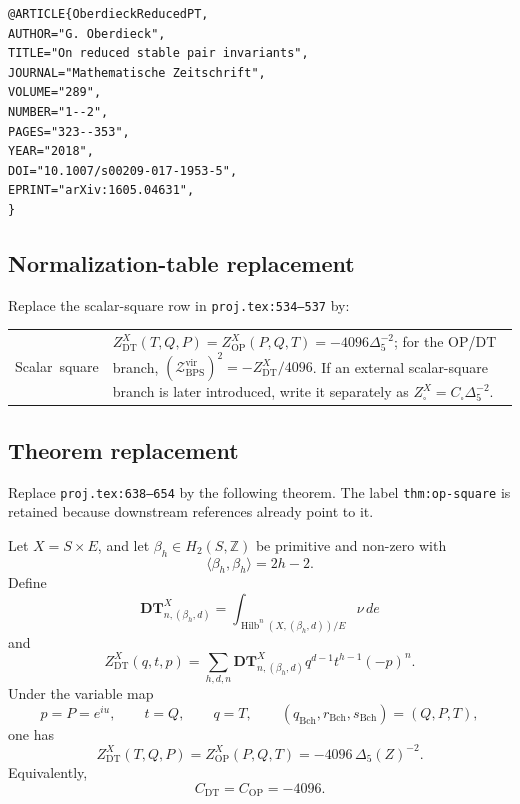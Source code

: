 \begin{verbatim}
@ARTICLE{OberdieckReducedPT,
AUTHOR="G. Oberdieck",
TITLE="On reduced stable pair invariants",
JOURNAL="Mathematische Zeitschrift",
VOLUME="289",
NUMBER="1--2",
PAGES="323--353",
YEAR="2018",
DOI="10.1007/s00209-017-1953-5",
EPRINT="arXiv:1605.04631",
}
\end{verbatim}

\subsection{Normalization-table replacement}

Replace the scalar-square row in \texttt{proj.tex:534--537} by:
\begin{center}
\small
\begin{tabular}{p{}p{}}
\hbox{Scalar square} &
\(Z^X_{\mathrm{DT}}(T,Q,P)=Z^X_{\mathrm{OP}}(P,Q,T)
=-4096\Delta_5^{-2}\);
for the OP/DT branch,
\((\mathcal Z_{\mathrm{BPS}}^{\mathrm{vir}})^2
=-Z^X_{\mathrm{DT}}/4096\).
If an external scalar-square branch is later introduced, write it
separately as \(Z^X_{\square}=C_{\square}\Delta_5^{-2}\). \\
\end{tabular}
\end{center}

\subsection{Theorem replacement}

Replace \texttt{proj.tex:638--654} by the following theorem.  The label
\texttt{thm:op-square} is retained because downstream references already
point to it.

\begin{theorem}
\label{thm:op-square}
Let \(X=S\times E\), and let
\(\beta_h\in H_2(S,\mathbb Z)\) be primitive and non-zero with
\[
\langle\beta_h,\beta_h\rangle=2h-2.
\]
Define
\[
\mathbf{DT}^X_{n,(\beta_h,d)}
=\int_{\operatorname{Hilb}^n(X,(\beta_h,d))/E}\nu\,de
\]
and
\[
Z^X_{\mathrm{DT}}(q,t,p)
=\sum_{h,d,n}\mathbf{DT}^X_{n,(\beta_h,d)}
q^{d-1}t^{h-1}(-p)^n.
\]
Under the variable map
\[
p=P=e^{iu},\qquad t=Q,\qquad q=T,
\qquad
(q_{\mathrm{Bch}},r_{\mathrm{Bch}},s_{\mathrm{Bch}})=(Q,P,T),
\]
one has
\begin{equation}
\label{eq:dt-op-square}
Z^X_{\mathrm{DT}}(T,Q,P)
=Z^X_{\mathrm{OP}}(P,Q,T)
=-4096\,\Delta_5(Z)^{-2}.
\end{equation}
Equivalently,
\[
C_{\mathrm{DT}}=C_{\mathrm{OP}}=-4096.
\]
\end{theorem}

